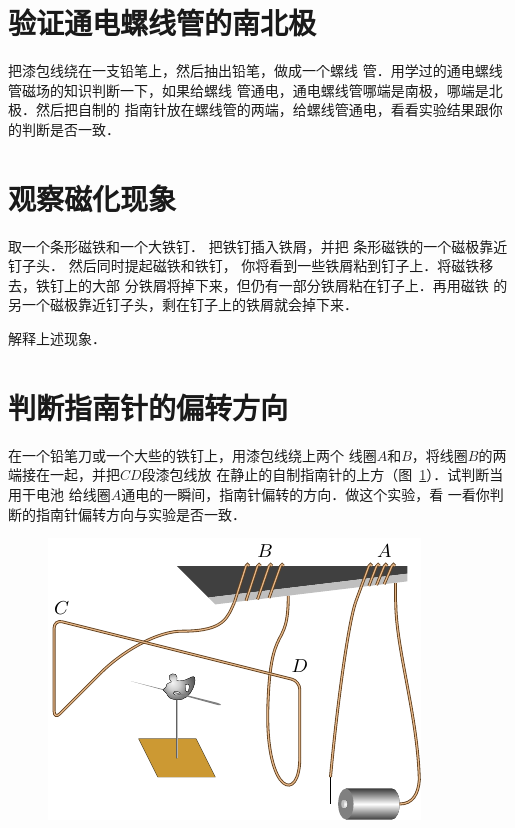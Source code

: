     \section{验证通电螺线管的南北极}
把漆包线绕在一支铅笔上，然后抽出铅笔，做成一个螺线
管．用学过的通电螺线管磁场的知识判断一下，如果给螺线
管通电，通电螺线管哪端是南极，哪端是北极．然后把自制的
指南针放在螺线管的两端，给螺线管通电，看看实验结果跟你
的判断是否一致．

\section{观察磁化现象}
取一个条形磁铁和一个大铁钉．
把铁钉插入铁屑，并把
条形磁铁的一个磁极靠近钉子头．
然后同时提起磁铁和铁钉，
你将看到一些铁屑粘到钉子上．将磁铁移去，铁钉上的大部
分铁屑将掉下来，但仍有一部分铁屑粘在钉子上．再用磁铁
的另一个磁极靠近钉子头，剩在钉子上的铁屑就会掉下来．

解释上述现象．

\section{判断指南针的偏转方向}
在一个铅笔刀或一个大些的铁钉上，用漆包线绕上两个
线圈$A$和$B$，将线圈$B$的两端接在一起，并把$CD$段漆包线放
在静止的自制指南针的上方（图~\ref{fig_C_10-12}）．试判断当用干电池
给线圈$A$通电的一瞬间，指南针偏转的方向．做这个实验，看
一看你判断的指南针偏转方向与实验是否一致．
\begin{figure}[htbp]
    \centering
    \includegraphics{fig/C/10-12.pdf}
    \caption{}\label{fig_C_10-12}
\end{figure}

